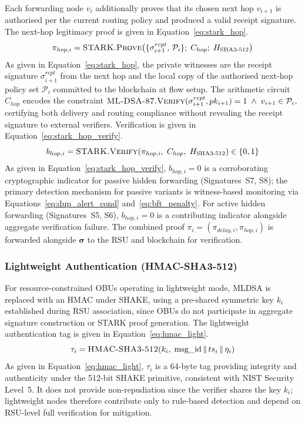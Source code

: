 \documentclass[12pt, a4paper]{report}
\begin{document}
Each forwarding node $v_i$ additionally proves that
its chosen next hop $v_{i+1}$ is authorised per the
current routing policy and produced a valid receipt
signature. The next-hop legitimacy proof is given in
Equation~\eqref{eq:stark_hop}.
\begin{equation}
\pi_{hop,i} = \textsc{STARK.Prove}\!\left(
\{\sigma^{rcpt}_{i+1},\, \mathcal{P}_i\};\;
C_{hop};\;
H_{\text{SHA3-512}}
\right)
\label{eq:stark_hop}
\end{equation}
As given in Equation~\eqref{eq:stark_hop}, the private
witnesses are the receipt signature
$\sigma^{rcpt}_{i+1}$ from the next hop and the
local copy of the authorised next-hop policy set
$\mathcal{P}_i$ committed to the blockchain at flow
setup. The arithmetic circuit $C_{hop}$ encodes the
constraint $\textsc{ML-DSA-87.Verify}(
\sigma^{rcpt}_{i+1}, pk_{i+1}) = 1 \;\land\;
v_{i+1} \in \mathcal{P}_i$, certifying both
delivery and routing compliance without revealing
the receipt signature to external verifiers.
Verification is given in
Equation~\eqref{eq:stark_hop_verify}.
\begin{equation}
b_{hop,i} = \textsc{STARK.Verify}\!\left(
\pi_{hop,i},\; C_{hop},\;
H_{\text{SHA3-512}}
\right) \in \{0, 1\}
\label{eq:stark_hop_verify}
\end{equation}
As given in Equation~\eqref{eq:stark_hop_verify},
$b_{hop,i} = 0$ is a corroborating cryptographic
indicator for passive hidden forwarding
(Signatures~S7, S8); the primary detection mechanism
for passive variants is witness-based monitoring
via Equations~\eqref{eq:dup_alert_cond}
and~\eqref{eq:bft_penalty}. For active hidden
forwarding (Signatures~S5, S6), $b_{hop,i} = 0$
is a contributing indicator alongside aggregate
verification failure. The combined proof
$\pi_i = (\pi_{delay,i}, \pi_{hop,i})$ is forwarded
alongside $\boldsymbol{\sigma}$ to the \ac{RSU}
and blockchain for verification.


\subsubsection{Lightweight Authentication (HMAC-SHA3-512)}

For resource-constrained \ac{OBU}s operating in
lightweight mode, \ac{MLDSA} is replaced with an
\ac{HMAC} under \ac{SHAKE}, using a pre-shared
symmetric key $k_i$ established during \ac{RSU}
association, since \ac{OBU}s do not participate in
aggregate signature construction or \ac{STARK} proof
generation. The lightweight authentication tag is
given in Equation~\eqref{eq:hmac_light}.
\begin{equation}
\tau_i = \textsc{HMAC-SHA3-512}\!\left(k_i,\;
\text{msg\_id} \,\|\, ts_i \,\|\, \eta_i
\right)
\label{eq:hmac_light}
\end{equation}
As given in Equation~\eqref{eq:hmac_light}, $\tau_i$
is a 64-byte tag providing integrity and authenticity
under the 512-bit \ac{SHAKE} primitive, consistent
with NIST Security Level~5. It does not provide
non-repudiation since the verifier shares the key
$k_i$; lightweight nodes therefore contribute only
to rule-based detection and depend on \ac{RSU}-level
full verification for mitigation.
\end{document}
